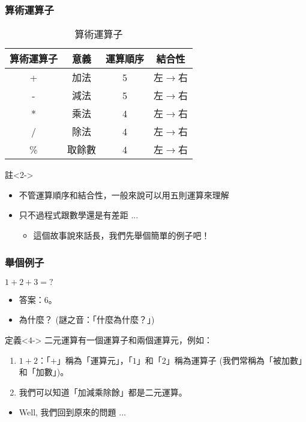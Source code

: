 \documentclass[utf8]{beamer}
\begin{document}
\begin{CJK}{UTF8}{bkai}
\begin{frame}
  \frametitle{算術運算子}
  \begin{table}[h]
  \begin{tabular}{|c|c|c|c|}
  \hline
  算術運算子  & 意義 & 運算順序 & 結合性\\
  \hline
  +         & 加法 & 5       & 左$\rightarrow$右\\
  \hline
  -         & 減法 & 5       & 左$\rightarrow$右\\
  \hline
  *         & 乘法 & 4       & 左$\rightarrow$右\\
  \hline
  /         & 除法 & 4       & 左$\rightarrow$右\\
  \hline
  \%        & 取餘數 & 4       & 左$\rightarrow$右\\
  \hline
  \end{tabular}
  \caption{算術運算子}
  \end{table}
  \begin{exampleblock}{註}<2->
    \begin{itemize}
    \item<2-> 不管\alert{運算順序}和\alert{結合性}，一般來說可以用五則運算來理解
    \item<3-> 只不過程式跟數學還是有差距 ...
      \begin{itemize}[<4->]
      \item 這個故事說來話長，我們先舉個簡單的例子吧！
      \end{itemize}
    \end{itemize}
  \end{exampleblock}
\end{frame}

\begin{frame}
  \frametitle{舉個例子}
  \begin{exampleblock}{$1+2+3=?$}
    \begin{itemize}
    \item<2-> 答案：6。
    \item<3-> 為什麼？ (謎之音：「什麼為什麼？」)
    \end{itemize}
  \end{exampleblock}
  \begin{block}{定義}<4->
  \alert{二元運算}有一個\alert{運算子}和兩個\alert{運算元}，例如：
    \begin{enumerate}
    \item<5-> $1+2$：「$+$」稱為「運算元」，「$1$」和「$2$」稱為運算子 (我們常稱為「被加數」和「加數」)。
    \item<6-> 我們可以知道「加減乘除餘」都是二元運算。
    \end{enumerate}
  \end{block}
  \begin{itemize}[<7->]
  \item Well, 我們回到原來的問題 ...
  \end{itemize}
\end{frame}


\end{CJK}
\end{document}
